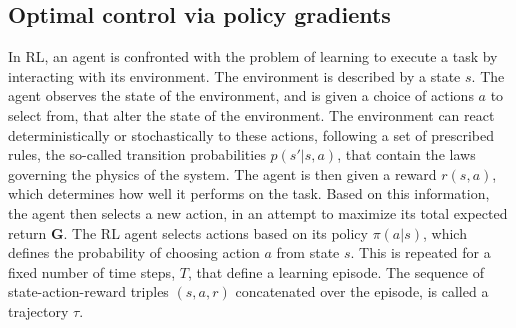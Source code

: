 



\subsection{\label{subsec:OC_via_RL}Optimal control via policy gradients}

In RL, an agent is confronted with the problem of learning to execute a task by interacting with its environment. The environment is described by a state $s$. The agent observes the state of the environment, and is given a choice of actions $a$ to select from, that alter the state of the environment. The environment can react deterministically or stochastically to these actions, following a set of prescribed rules, the so-called transition probabilities $p(s'|s,a)$, that contain the laws governing the physics of the system. The agent is then given a reward $r(s,a)$, which determines how well it performs on the task. Based on this information, the agent then selects a new action, in an attempt to maximize its total expected return $\mathbf{G}$.
The RL agent selects actions based on its policy $\pi(a|s)$, which defines the probability of choosing action $a$ from state $s$. This is repeated for a fixed number of time steps, $T$, that define a learning episode. The sequence of state-action-reward triples $(s,a,r)$ concatenated over the episode, is called a trajectory $\tau$.


